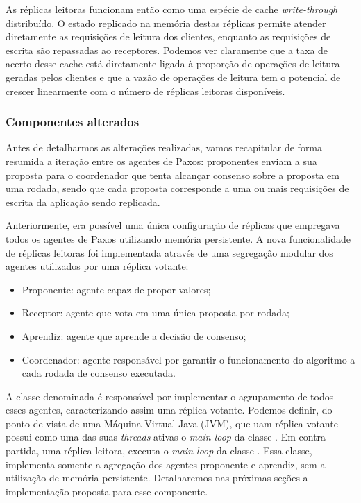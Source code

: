 As réplicas leitoras funcionam então como uma espécie de cache \emph{write-through}
distribuído. O estado replicado na memória destas réplicas permite atender diretamente as
requisições de leitura dos clientes, enquanto as requisições de escrita são repassadas ao
receptores. Podemos ver claramente que a taxa de acerto desse cache está diretamente
ligada à proporção de operações de leitura geradas pelos clientes e que a vazão de
operações de leitura tem o potencial de crescer linearmente com o número de réplicas
leitoras disponíveis.

\subsubsection{Componentes alterados}

Antes de detalharmos as alterações realizadas, vamos recapitular de forma resumida a
iteração entre os agentes de Paxos: proponentes enviam a sua proposta para o coordenador
que tenta alcançar consenso sobre a proposta em uma rodada, sendo que cada proposta
corresponde a uma ou mais requisições de escrita da aplicação sendo replicada.

Anteriormente, era possível uma única configuração de réplicas que empregava todos os
agentes de Paxos utilizando memória persistente. A nova funcionalidade de réplicas
leitoras foi implementada através de uma segregação modular dos agentes utilizados por uma
réplica votante:

\begin{itemize}
  \item Proponente: agente capaz de propor valores;
  \item Receptor: agente que vota em uma única proposta por rodada;
  \item Aprendiz: agente que aprende a decisão de consenso;
  \item Coordenador: agente responsável por garantir o funcionamento do algoritmo a cada
    rodada de consenso executada.
\end{itemize}

A classe denominada  é responsável por implementar o
agrupamento de todos esses agentes, caracterizando assim uma réplica votante. Podemos
definir, do ponto de vista de uma Máquina Virtual Java (JVM), que uam réplica votante
possui como uma das suas \emph{threads} ativas o \emph{main loop} da classe
. Em contra partida, uma réplica leitora, executa o
\emph{main loop} da classe . Essa classe, implementa somente
a agregação dos agentes proponente e aprendiz, sem a utilização de memória persistente.
Detalharemos nas próximas seções a implementação proposta para esse componente.

